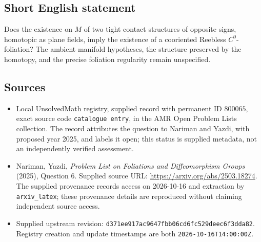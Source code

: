 \documentclass[11pt]{article}
\begin{document}
\subsection{Short English statement}
Does the existence on \(M\) of two tight contact structures of opposite signs, homotopic as plane fields, imply the existence of a cooriented Reebless \(C^0\)-foliation? The ambient manifold hypotheses, the structure preserved by the homotopy, and the precise foliation regularity remain unspecified.
\subsection{Sources}
\begin{itemize}
\item Local UnsolvedMath registry, supplied record with permanent ID \(800065\), exact source code \texttt{catalogue entry}, in the AMR Open Problem Lists collection. The record attributes the question to Nariman and Yazdi, with proposed year 2025, and labels it open; this status is supplied metadata, not an independently verified assessment.
\item Nariman, Yazdi, \emph{Problem List on Foliations and Diffeomorphism Groups} (2025), Question 6. Supplied source URL: \url{https://arxiv.org/abs/2503.18274}. The supplied provenance records access on 2026-10-16 and extraction by \texttt{arxiv\_latex}; these provenance details are reproduced without claiming independent source access.
\item Supplied upstream revision: \texttt{d371ee917ac9647fbb06cd6fc529deec6f3dda82}. Registry creation and update timestamps are both \texttt{2026-10-16T14:00:00Z}.
\end{itemize}
\end{document}
